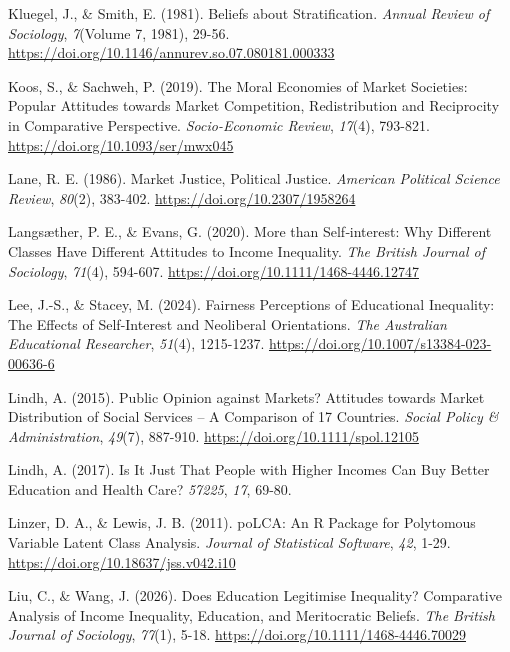 \documentclass[
  spanish,
  a4paper,
  oneside]{scrbook}
\newlength{\cslhangindent}
\newenvironment{CSLReferences}[2] %
 {\begin{list}{}{%
  \setlength{\itemindent}{0pt}
  \setlength{\leftmargin}{0pt}
  \setlength{\parsep}{0pt}
  \ifodd #1
   \setlength{\leftmargin}{\cslhangindent}
   \setlength{\itemindent}{-1\cslhangindent}
  \fi
  \setlength{\itemsep}{#2\baselineskip}}}
 {\end{list}}
\begin{document}
\begin{CSLReferences}{1}{0}
Kluegel, J., \& Smith, E. (1981). Beliefs about Stratification.
\emph{Annual Review of Sociology}, \emph{7}(Volume 7, 1981), 29-56.
\url{https://doi.org/10.1146/annurev.so.07.080181.000333}

Koos, S., \& Sachweh, P. (2019). The Moral Economies of Market
Societies: Popular Attitudes towards Market Competition, Redistribution
and Reciprocity in Comparative Perspective. \emph{Socio-Economic
Review}, \emph{17}(4), 793-821. \url{https://doi.org/10.1093/ser/mwx045}

Lane, R. E. (1986). Market Justice, Political Justice. \emph{American
Political Science Review}, \emph{80}(2), 383-402.
\url{https://doi.org/10.2307/1958264}

Langsæther, P. E., \& Evans, G. (2020). More than Self‐interest: Why
Different Classes Have Different Attitudes to Income Inequality.
\emph{The British Journal of Sociology}, \emph{71}(4), 594-607.
\url{https://doi.org/10.1111/1468-4446.12747}

Lee, J.-S., \& Stacey, M. (2024). Fairness Perceptions of Educational
Inequality: The Effects of Self-Interest and Neoliberal Orientations.
\emph{The Australian Educational Researcher}, \emph{51}(4), 1215-1237.
\url{https://doi.org/10.1007/s13384-023-00636-6}

Lindh, A. (2015). Public Opinion against Markets? Attitudes towards
Market Distribution of Social Services -- A Comparison of 17 Countries.
\emph{Social Policy \& Administration}, \emph{49}(7), 887-910.
\url{https://doi.org/10.1111/spol.12105}

Lindh, A. (2017). Is It Just That People with Higher Incomes Can Buy
Better Education and Health Care? \emph{57225}, \emph{17}, 69-80.

Linzer, D. A., \& Lewis, J. B. (2011). poLCA: An R Package for
Polytomous Variable Latent Class Analysis. \emph{Journal of Statistical
Software}, \emph{42}, 1-29. \url{https://doi.org/10.18637/jss.v042.i10}

Liu, C., \& Wang, J. (2026). Does Education Legitimise Inequality?
Comparative Analysis of Income Inequality, Education, and Meritocratic
Beliefs. \emph{The British Journal of Sociology}, \emph{77}(1), 5-18.
\url{https://doi.org/10.1111/1468-4446.70029}


\end{CSLReferences}
\end{document}
